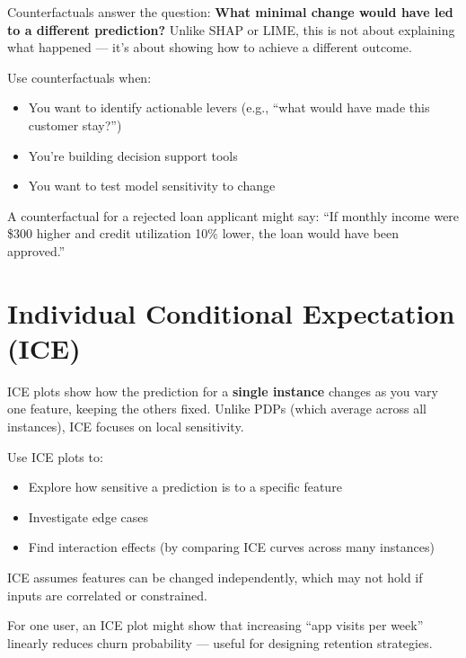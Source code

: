 \documentclass[12pt,openany]{book}
\begin{document}
Counterfactuals answer the question: \textbf{What minimal change would have led to a different prediction?} Unlike SHAP or LIME, this is not about explaining what happened — it’s about showing how to achieve a different outcome.

Use counterfactuals when:
\begin{itemize}
  \item You want to identify actionable levers (e.g., ``what would have made this customer stay?'')
  \item You're building decision support tools
  \item You want to test model sensitivity to change
\end{itemize}

\begin{examplebox}
A counterfactual for a rejected loan applicant might say: ``If monthly income were \$300 higher and credit utilization 10\% lower, the loan would have been approved.''
\end{examplebox}

\section{Individual Conditional Expectation (ICE)}

ICE plots show how the prediction for a \textbf{single instance} changes as you vary one feature, keeping the others fixed. Unlike PDPs (which average across all instances), ICE focuses on local sensitivity.

Use ICE plots to:
\begin{itemize}
  \item Explore how sensitive a prediction is to a specific feature
  \item Investigate edge cases
  \item Find interaction effects (by comparing ICE curves across many instances)
\end{itemize}

\begin{notebox}
ICE assumes features can be changed independently, which may not hold if inputs are correlated or constrained.
\end{notebox}

\begin{examplebox}
For one user, an ICE plot might show that increasing ``app visits per week'' linearly reduces churn probability — useful for designing retention strategies.
\end{examplebox}
\end{document}
